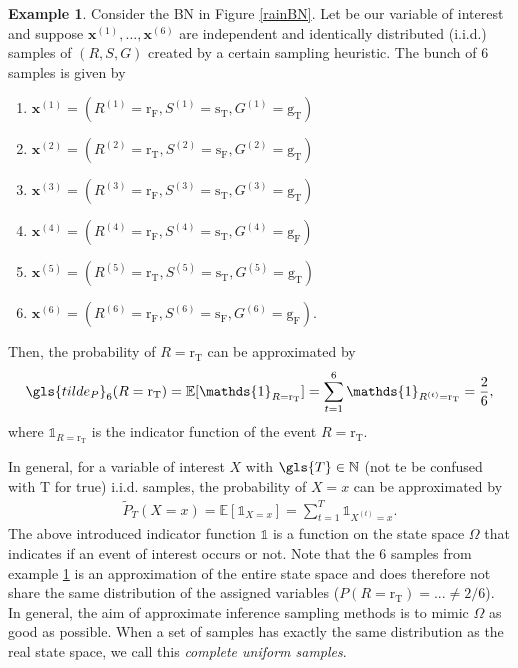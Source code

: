 \documentclass[a4paper, twoside, 11pt]{report}
\newcommand{\bfx}{{\mathbf{x}}}
\theoremstyle{plain}
\theoremstyle{definition}
\newtheorem{example}[thm]{Example}
\theoremstyle{remark}
\newcommand{\E}{{\mathbb E}}
\newcommand{\gT}{{\text{g}_\text{T} }}
\newcommand{\gF}{{\text{g}_\text{F} }}
\newcommand{\sT}{{\text{s}_\text{T} }}
\newcommand{\sF}{{\text{s}_\text{F} }}
\newcommand{\rr}{{\text{r} }}
\newcommand{\rT}{{\text{r}_\text{T} }}
\newcommand{\rF}{{\text{r}_\text{F} }}
\def\N{{\mathbb N}}
\begin{document}
\begin{example}\label{ex:sampling}
Consider the BN in Figure \ref{rainBN}. Let \rr be our variable of interest and suppose $\bfx^{(1)}, \ldots , \bfx^{(6)}$ are independent and identically distributed (i.i.d.) samples of $(R, S, G)$ created by a certain sampling heuristic. The bunch of $6$ samples is given by
\begin{multicols}{2}
\begin{enumerate}
\item $\bfx^{(1)} = ( R^{(1)} = \rF, S^{(1)} = \sT,  G^{(1)} = \gT)$
\item $\bfx^{(2)} = ( R^{(2)} = \rT, S^{(2)} = \sF,  G^{(2)} = \gT)$
\item $\bfx^{(3)} = ( R^{(3)} = \rF, S^{(3)} = \sT,  G^{(3)} = \gT)$
\item $\bfx^{(4)} = ( R^{(4)} = \rF, S^{(4)} = \sT,  G^{(4)} = \gF )$
\item $\bfx^{(5)} = ( R^{(5)} = \rT, S^{(5)} = \sT,  G^{(5)} = \gT)$
\item $\bfx^{(6)} = ( R^{(6)} = \rF, S^{(6)} = \sF,  G^{(6)} = \gF)$.
\end{enumerate}
\end{multicols}
\noindent Then, the probability of $R = \text{r}_\text{T}$ can be approximated by 
\begin{align*}
\gls{tilde_P}_6(R = \rT ) = \E[ \mathds{1}_{R = \rT} ] = \sum_{t=1}^6 \mathds{1}_{R^{(t)} = \rT} = \frac{2}{6},
\end{align*}
where $\mathds{1}_{R = \rT}$ is the indicator function of the event $R = \rT$.
\end{example}
In general, for a variable of interest $X$ with $\gls{T} \in \N$ (not te be confused with T  for true) i.i.d. samples, the probability of $X = x$ can be approximated by 
\begin{align*}
\widetilde{P}_T(X = x) = \E[ \mathds{1}_{X=x} ] = \sum_{t=1}^T \mathds{1}_{X^{(t)} = x}.
\end{align*}
The above introduced indicator function $\mathds{1}$ is a function on the state space $\Omega$ that indicates if an event of interest occurs or not. Note that the 6 samples from example \ref{ex:sampling} is an approximation of the entire state space and does therefore not share the same distribution of the assigned variables ($P(R = \rT ) =  ... \neq 2/6$). In general, the aim of approximate inference sampling methods is to mimic $\Omega$ as good as possible. When a set of samples has exactly the same distribution as the real state space, we call this \textit{complete uniform samples}. \\
\end{document}
